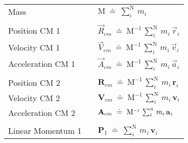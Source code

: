 \documentclass[10pt]{article}
\begin{document}
\par \bigskip\bigskip \hspace{-2.40em} \begin{tabular}{lll}
Mass & \hspace{+0.00em} & ${\mathrm{M}} ~\doteq~ \sum_i^{\scriptscriptstyle{\mathrm{N}}} \, m_i$ \vspace{+0.99em} \\
\\
Position {\small CM} 1 & \hspace{+0.00em} & ${\vec{\mathit{R}}}_{cm} ~\doteq~ {\mathrm{M}}^{\scriptscriptstyle -1} \, \sum_i^{\scriptscriptstyle{\mathrm{N}}} \, m_i \, {\vec{\mathit{r}}_{i}}$ \vspace{+0.99em} \\
Velocity {\small CM} 1 & \hspace{+0.00em} & ${\vec{\mathit{V}}}_{cm} ~\doteq~ {\mathrm{M}}^{\scriptscriptstyle -1} \, \sum_i^{\scriptscriptstyle{\mathrm{N}}} \, m_i \, {\vec{\mathit{v}}_{i}}$ \vspace{+0.99em} \\
Acceleration {\small CM} 1 & \hspace{+0.00em} & ${\vec{\mathit{A}}}_{cm} ~\doteq~ {\mathrm{M}}^{\scriptscriptstyle -1} \, \sum_i^{\scriptscriptstyle{\mathrm{N}}} \, m_i \, {\vec{\mathit{a}}_{i}}$ \vspace{+0.99em} \\
\\
Position {\small CM} 2 & \hspace{+0.00em} & ${\mathbf{R}}_{cm} ~\doteq~ {\mathrm{M}}^{\scriptscriptstyle -1} \, \sum_i^{\scriptscriptstyle{\mathrm{N}}} \, m_i \, {\mathbf{r}}_{i}$ \vspace{+0.99em} \\
Velocity {\small CM} 2 & \hspace{+0.00em} & ${\mathbf{V}}_{cm} ~\doteq~ {\mathrm{M}}^{\scriptscriptstyle -1} \, \sum_i^{\scriptscriptstyle{\mathrm{N}}} \, m_i \, {\mathbf{v}}_{i}$ \vspace{+0.99em} \\
Acceleration {\small CM} 2 & \hspace{+0.00em} & ${\mathbf{A}}_{cm} ~\doteq~ {\mathrm{M}}^{\scriptscriptstyle -1} \, \sum_i^{\scriptscriptstyle{\mathrm{N}}} \, m_i \, {\mathbf{a}}_{\hspace{+0.045em}i}$ \vspace{+0.99em} \\
\\
Linear Momentum 1 & \hspace{+0.00em} & ${\mathbf{P}}_1 ~\doteq~ \sum_i^{\scriptscriptstyle{\mathrm{N}}} \, m_i \, {\mathbf{v}}_{i}$ \vspace{+0.99em} \\

\end{tabular}
\end{document}
